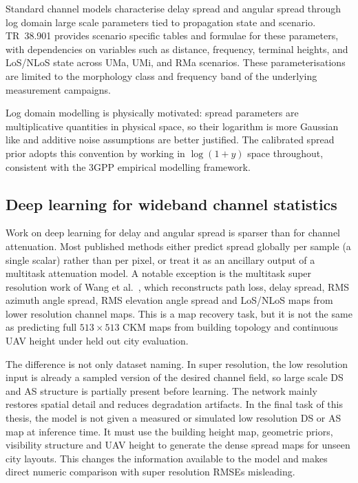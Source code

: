 Standard channel models characterise delay spread and angular spread through
log domain large scale parameters tied to propagation state and scenario.
TR~38.901 \cite{tr38901} provides scenario specific tables and formulae for
these parameters, with dependencies on variables such as distance, frequency,
terminal heights, and LoS/NLoS state across UMa, UMi, and RMa scenarios.  These
parameterisations are limited to the morphology class and frequency band of the
underlying measurement campaigns.

Log domain modelling is physically motivated: spread parameters are
multiplicative quantities in physical space, so their logarithm is more
Gaussian like and additive noise assumptions are better justified. The calibrated spread prior adopts
this convention by working in $\log(1+y)$ space throughout, consistent with the
3GPP empirical modelling framework.

\subsection{Deep learning for wideband channel statistics}

Work on deep learning for delay and angular spread is sparser than for channel
attenuation. Most published methods either predict spread globally per sample
(a single scalar) rather than per pixel, or treat it as an ancillary output of a
multitask attenuation model. A notable exception is the multitask super
resolution work of Wang et al.\ \cite{wang2023multitasksr}, which reconstructs
path loss, delay spread, RMS azimuth angle spread, RMS elevation angle spread
and LoS/NLoS maps from lower resolution channel maps. This is a map recovery
task, but it is not the same as predicting full \(513\times513\) CKM maps from
building topology and continuous UAV height under held out city evaluation.

The difference is not only dataset naming. In super resolution, the low
resolution input is already a sampled version of the desired channel field, so
large scale DS and AS structure is partially present before learning. The
network mainly restores spatial detail and reduces degradation artifacts. In
the final task of this thesis, the model is not given a measured or simulated
low resolution DS or AS map at inference time. It must use the building height
map, geometric priors, visibility structure and UAV height to generate the
dense spread maps for unseen city layouts. This changes the information
available to the model and makes direct numeric comparison with super
resolution RMSEs misleading.

